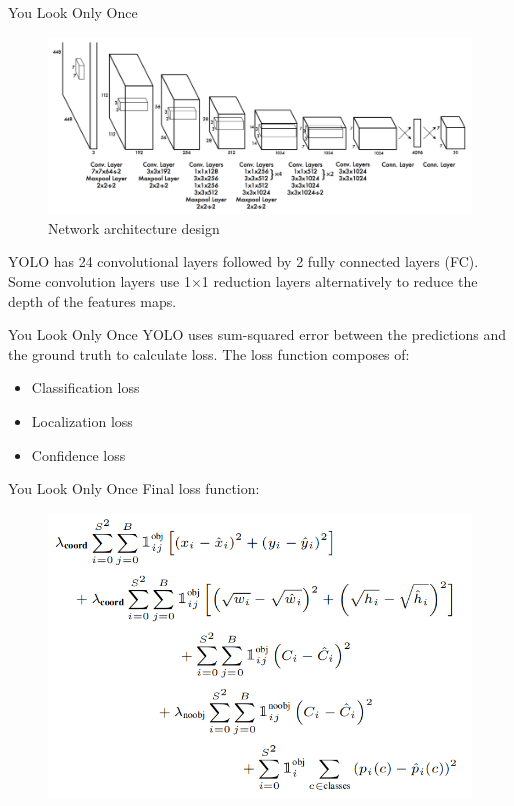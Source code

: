 \documentclass[aspectratio=169]{beamer}
\begin{document}
\begin{frame}{You Look Only Once}
\begin{figure}
    \centering
    \includegraphics[scale=.2]{demo/figs/yolo3.png}
    \caption{Network architecture design}
\end{figure}
YOLO has 24 convolutional layers followed by 2 fully connected layers (FC). Some convolution layers use 1$\times$1 reduction layers alternatively to reduce the depth of the features maps.
\end{frame}

\begin{frame}{You Look Only Once}
YOLO uses sum-squared error between the predictions and the ground truth to calculate loss. The loss function composes of:
\begin{itemize}
    \item Classification loss
    \item Localization loss
    \item Confidence loss
\end{itemize}
\end{frame}

\begin{frame}{You Look Only Once}
Final loss function:
\begin{figure}
    \centering
    \includegraphics[scale=.35]{demo/figs/yololoss.png}
\end{figure}
\end{frame}
\end{document}

